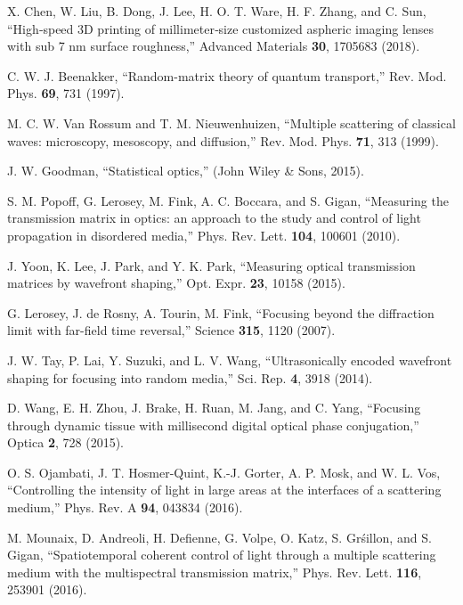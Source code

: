 \documentclass[9pt,twocolumn,twoside]{osajnl}
\begin{document}
\begin{thebibliography}{99}
 X. Chen, W. Liu, B. Dong, J. Lee, H. O. T. Ware, H. F. Zhang, and C. Sun, \enquote{High‐speed 3D printing of millimeter‐size customized aspheric imaging lenses with sub 7 nm surface roughness,} Advanced Materials \textbf{30}, 1705683 (2018).


 C. W. J. Beenakker, \enquote{Random-matrix theory of quantum transport,} Rev. Mod. Phys. \textbf{69}, 731 (1997).

 M. C. W. Van Rossum and T. M. Nieuwenhuizen, \enquote{Multiple scattering of classical waves: microscopy, mesoscopy, and diffusion,} Rev. Mod. Phys. \textbf{71}, 313 (1999).



 J. W. Goodman, \enquote{Statistical optics,} (John Wiley \& Sons, 2015).

 S. M. Popoff, G. Lerosey, M. Fink, A. C. Boccara, and S. Gigan, \enquote{Measuring the transmission matrix in optics: an approach to the study and control of light propagation in disordered media,} Phys. Rev. Lett. \textbf{104}, 100601 (2010).

 J. Yoon, K. Lee, J. Park, and Y. K. Park, \enquote{Measuring optical transmission matrices by wavefront shaping,} Opt. Expr. \textbf{23}, 10158 (2015).

 G. Lerosey, J. de Rosny, A. Tourin, M. Fink, \enquote{Focusing beyond the diffraction limit with far-field time reversal,} Science \textbf{315}, 1120 (2007).


 J. W. Tay, P. Lai, Y. Suzuki, and L. V. Wang, \enquote{Ultrasonically encoded wavefront shaping for focusing into random media,} Sci. Rep. \textbf{4}, 3918 (2014).

 D. Wang, E. H. Zhou, J. Brake, H. Ruan, M. Jang, and C. Yang, \enquote{Focusing through dynamic tissue with millisecond digital optical phase conjugation,} Optica \textbf{2}, 728 (2015).



 O. S. Ojambati, J. T. Hosmer-Quint, K.-J. Gorter, A. P. Mosk, and W. L. Vos, \enquote{Controlling the intensity of light in large areas at the interfaces of a scattering medium,} Phys. Rev. A \textbf{94}, 043834 (2016).

 M. Mounaix, D. Andreoli, H. Defienne, G. Volpe, O. Katz, S. Gr\'sillon, and S. Gigan, \enquote{Spatiotemporal coherent control of light through a multiple scattering medium with the multispectral transmission matrix,} Phys. Rev. Lett. \textbf{116}, 253901 (2016).


\end{thebibliography}
\end{document}
